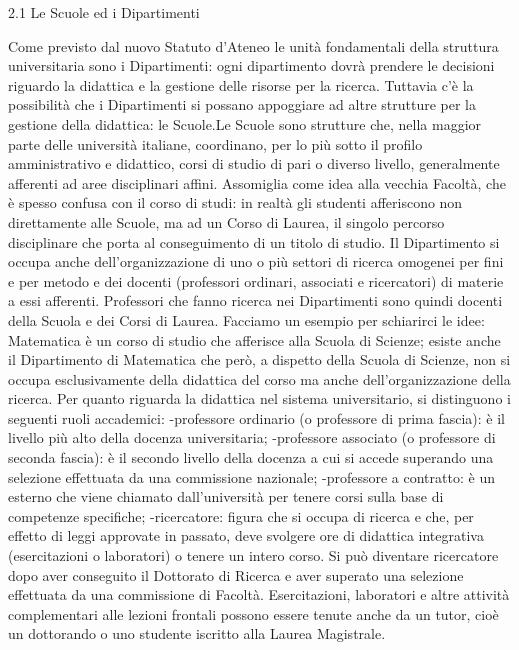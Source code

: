 2.1 Le Scuole ed i Dipartimenti



Come previsto dal nuovo Statuto d'Ateneo le unità fondamentali della struttura universitaria sono i Dipartimenti: ogni dipartimento dovrà prendere le decisioni riguardo la didattica e la gestione delle risorse per la ricerca. Tuttavia c'è la possibilità che i Dipartimenti si possano appoggiare ad altre strutture per la gestione della didattica: le Scuole.Le Scuole sono strutture che, nella maggior parte delle università italiane, coordinano, per lo più sotto il profilo amministrativo e didattico, corsi di studio di pari o diverso livello, generalmente afferenti ad aree disciplinari affini. Assomiglia come idea alla vecchia Facoltà, che è spesso confusa con il corso di studi: in realtà gli studenti afferiscono non direttamente alle Scuole, ma ad un Corso di Laurea, il singolo percorso disciplinare che porta al conseguimento di un titolo di studio.
Il Dipartimento si occupa anche dell'organizzazione di uno o più settori di ricerca omogenei per fini e per metodo e dei docenti (professori ordinari, associati e ricercatori) di materie a essi afferenti. Professori che fanno ricerca nei Dipartimenti sono quindi docenti della Scuola e dei Corsi di Laurea.
Facciamo un esempio per schiarirci le idee: Matematica è un corso di studio che afferisce alla Scuola di Scienze; esiste anche il Dipartimento di Matematica che però, a dispetto della Scuola di Scienze, non si occupa esclusivamente della didattica del corso ma anche dell’organizzazione della ricerca.
Per quanto riguarda la didattica nel sistema universitario, si distinguono i seguenti ruoli accademici:
    -professore ordinario (o professore di prima fascia): è il livello più alto della docenza universitaria;
    -professore associato (o professore di seconda fascia): è il secondo livello della docenza a cui si accede superando una selezione effettuata da una commissione nazionale;
    -professore a contratto: è un esterno che viene chiamato dall’università per tenere corsi sulla base di competenze specifiche;
    -ricercatore: figura che si occupa di ricerca e che, per effetto di leggi approvate in passato, deve svolgere ore di didattica integrativa (esercitazioni o laboratori) o tenere un intero corso. Si può diventare ricercatore dopo aver conseguito il Dottorato di Ricerca e aver superato una selezione effettuata da una commissione di Facoltà. 
Esercitazioni, laboratori e altre attività complementari alle lezioni frontali possono essere tenute anche da un tutor, cioè un dottorando o uno studente iscritto alla Laurea Magistrale.


